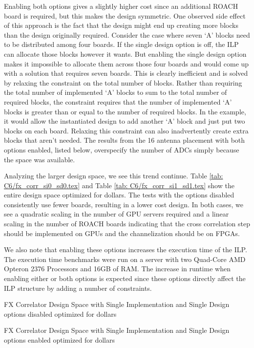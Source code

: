 
  
Enabling both options gives a slightly higher cost since an additional ROACH board is required, but this makes the design symmetric.
One observed side effect of this approach is the fact that the design might end up creating more blocks than the design originally required.
Consider the case where seven `A' blocks need to be distributed among four boards. 
If the single design option is off, the ILP can allocate those blocks however it wants.
But enabling the single design option makes it impossible to allocate them across those four boards and would come up with a solution that requires seven boards.
This is clearly inefficient and is solved by relaxing the constraint on the total number of blocks.
Rather than requiring the total number of implemented `A' blocks to sum to the total number of required blocks, the constraint requires that the number of implemented `A' blocks is greater than or equal to the number of required blocks.
In the example, it would allow the instantiated design to add another `A' block and just put two blocks on each board.
Relaxing this constraint can also inadvertently create extra blocks that aren't needed.
The results from the 16 antenna placement with both options enabled, listed below, overspecify the number of ADCs simply because the space was available.
  
  
  
Analyzing the larger design space, we see this trend continue. 
Table \ref{tab: C6/fx_corr_si0_sd0.tex} and Table \ref{tab: C6/fx_corr_si1_sd1.tex} show the entire design space optimized for dollars.
The tests with the options disabled consistently use fewer boards, resulting in a lower cost design.
In both cases, we see a quadratic scaling in the number of GPU servers required and a linear scaling in the number of ROACH boards indicating that the cross correlation step should be implemented on GPUs and the channelization should be on FPGAs.

We also note that enabling these options increases the execution time of the ILP.
The execution time benchmarks were run on a server with two Quad-Core AMD Opteron 2376 Processors and 16GB of RAM.
The increase in runtime when enabling either or both options is expected since these options directly affect the ILP structure by adding a number of constraints.



\begin{table}
\centering

\caption{FX Correlator Design Space with Single Implementation and Single Design options disabled optimized for dollars}
\label{tab: C6/fx_corr_si0_sd0.tex}


\caption{FX Correlator Design Space with Single Implementation and Single Design options enabled optimized for dollars}
\label{tab: C6/fx_corr_si1_sd1.tex}
\end{table} 

